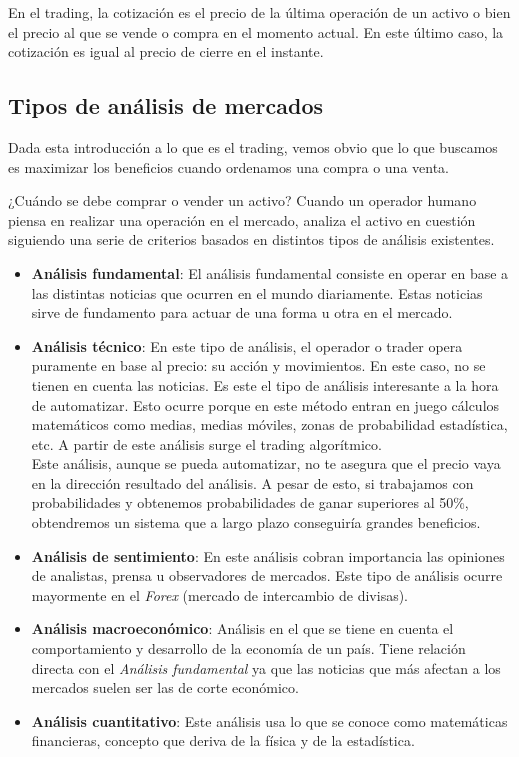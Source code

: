 En el trading, la cotización es el precio de la última operación de un activo o bien el precio al que se vende o compra en el momento actual. En este último caso, la cotización es igual al precio de cierre en el instante. \newline

\subsection{Tipos de análisis de mercados}

Dada esta introducción a lo que es el trading, vemos obvio que lo que buscamos es maximizar los beneficios cuando ordenamos una compra o una venta. \newline

¿Cuándo se debe comprar o vender un activo? Cuando un operador humano piensa en realizar una operación en el mercado, analiza el activo en cuestión siguiendo una serie de criterios basados en distintos tipos de análisis existentes. \newline

\begin{itemize}
	
	\item \textbf{Análisis fundamental}: El análisis fundamental consiste en operar en base a las distintas noticias que ocurren en el mundo diariamente. Estas noticias sirve de fundamento para actuar de una forma u otra en el mercado. 
	\item \textbf{Análisis técnico}: En este tipo de análisis, el operador o trader opera puramente en base al precio: su acción y movimientos. En este caso, no se tienen en cuenta las noticias. Es este el tipo de análisis interesante a la hora de automatizar. Esto ocurre porque en este método entran en juego cálculos matemáticos como medias, medias móviles, zonas de probabilidad estadística, etc. A partir de este análisis surge el trading algorítmico. \\
	Este análisis, aunque se pueda automatizar, no te asegura que el precio vaya en la dirección resultado del análisis. A pesar de esto, si trabajamos con probabilidades y obtenemos probabilidades de ganar superiores al 50\%, obtendremos un sistema que a largo plazo conseguiría grandes beneficios.
	\item \textbf{Análisis de sentimiento}: En este análisis cobran importancia las opiniones de analistas, prensa u observadores de mercados. Este tipo de análisis ocurre mayormente en el \textit{Forex} (mercado de intercambio de divisas).
	\item \textbf{Análisis macroeconómico}: Análisis en el que se tiene en cuenta el comportamiento y desarrollo de la economía de un país. Tiene relación directa con el \textit{Análisis fundamental} ya que las noticias que más afectan a los mercados suelen ser las de corte económico.
	\item \textbf{Análisis cuantitativo}: Este análisis usa lo que se conoce como matemáticas financieras, concepto que deriva de la física y de la estadística.
\end{itemize} 

